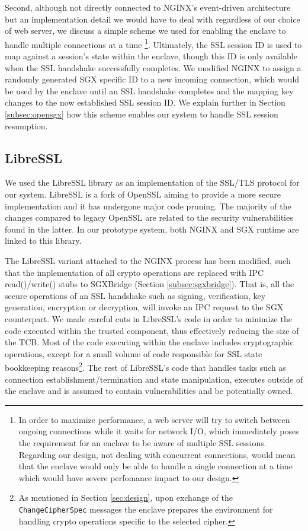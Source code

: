 \documentclass[../main.tex]{subfiles}
\begin{document}
Second, although not directly connected to NGINX's event-driven architecture
but an implementation detail we would have to deal with regardless of our
choice of web server, we discuss a simple scheme we used for enabling the
enclave to handle multiple connections at a time \footnote{In order to maximize
performance, a web server will try to switch between ongoing connections while
it waits for network I/O, which immediately poses the requirement for an
enclave to be aware of multiple SSL sessions. Regarding our design, not dealing
with concurrent connections, would mean that the enclave would only be able to
handle a single connection at a time which would have severe perfomance impact
to our design.}. Ultimately, the SSL session ID is used to map against a
session's state within the enclave, though this ID is only available when the
SSL handshake successfully completes. We modified NGINX to assign a randomly
generated SGX specific ID to a new incoming connection, which would be used by
the enclave until an SSL handshake completes and the mapping key changes to the
now established SSL session ID. We explain further in Section
\ref{subsec:opensgx} how this scheme enables our system to handle SSL session
resumption.

\subsection{LibreSSL}
\label{subsec:libressl}
We used the LibreSSL library as an implementation of the SSL/TLS protocol for
our system. LibreSSL is a fork of OpenSSL aiming to provide a more secure
implementation and it has undergone major code pruning. The majority of the
changes compared to legacy OpenSSL are related to the security vulnerabilities
found in the latter. In our prototype system, both NGINX and SGX runtime are
linked to this library.

The LibreSSL variant attached to the NGINX process has been modified, such that
 the implementation of all crypto operations are replaced with IPC
read()/write() stubs to SGXBridge (Section \ref{subsec:sgxbridge}). That is,
all the secure operations of an SSL handshake such as signing, verification,
key generation, encryption or decryption, will invoke an IPC request to the SGX
counterpart. We made careful cuts in LibreSSL's code in order to minimize the
code executed within the trusted component, thus effectively reducing the size
of the TCB. Most of the code executing within the enclave includes
cryptographic operations, except for a small volume of code responsible for
SSL state bookkeeping reasons\footnote{As mentioned in Section
\ref{sec:design}, upon exchange of the \texttt{ChangeCipherSpec} messages the
enclave prepares the environment for handling crypto operations specific to
the selected cipher.}. The rest of LibreSSL's code that handles tasks such as
connection establishment/termination and state manipulation, executes outside
of the enclave and is assumed to contain vulnerabilities and be potentially
owned.
\end{document}
